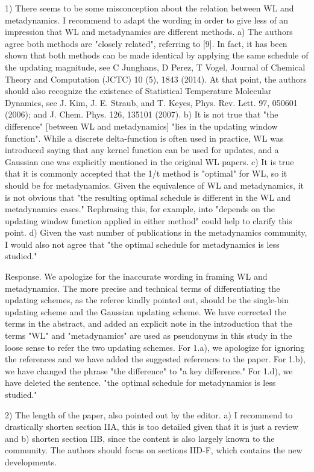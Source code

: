 \documentclass[preprint, superscriptaddress, floatfix]{revtex4-1}
\begin{document}
1) There seems to be some misconception about the relation between WL and metadynamics. I recommend to adapt the wording in order to give less of an impression that WL and metadynamics are different methods.
a) The authors agree both methods are "closely related", referring to [9]. In fact, it has been shown that both methods can be made identical by applying the same schedule of the updating magnitude, see C Junghans, D Perez, T Vogel, Journal of Chemical Theory and Computation (JCTC) 10 (5), 1843 (2014). At that point, the authors should also recognize the existence of Statistical Temperature Molecular Dynamics, see J. Kim, J. E. Straub, and T. Keyes, Phys. Rev. Lett. 97, 050601 (2006); and J. Chem. Phys. 126, 135101 (2007).
b) It is not true that "the difference" [between WL and metadynamics] "lies in the updating window function". While a discrete delta-function is often used in practice, WL was introduced saying that any kernel function can be used for updates, and a Gaussian one was explicitly mentioned in the original WL papers.
c) It is true that it is commonly accepted that the 1/t method is "optimal" for WL, so it should be for metadynamics. Given the equivalence of WL and metadynamics, it is not obvious that "the resulting optimal schedule is different in the WL and metadynamics cases." Rephrasing this, for example, into "depends on the updating window function applied in either method" could help to clarify this point.
d) Given the vast number of publications in the metadynamics community, I would also not agree that "the optimal schedule for metadynamics is less studied."

Response.
We apologize for the inaccurate wording in framing WL and metadynamics.
The more precise and technical terms of differentiating the updating schemes, as the referee kindly pointed out, should be the single-bin updating scheme and the Gaussian updating scheme.
We have corrected the terms in the abstract,
and added an explicit note in the introduction that the terms "WL" and "metadynamics" are used as pseudonyms in this study in the loose sense to refer the two updating schemes.
For 1.a), we apologize for ignoring the references
and we have added the suggested references to the paper.
For 1.b), we have changed the phrase "the difference" to "a key difference."
For 1.d), we have deleted the sentence. "the optimal schedule for metadynamics is less studied."


2) The length of the paper, also pointed out by the editor.
a) I recommend to drastically shorten section IIA, this is too detailed given that it is just a review and
b) shorten section IIB, since the content is also largely known to the community.
The authors should focus on sections IID-F, which contains the new developments.
\end{document}

